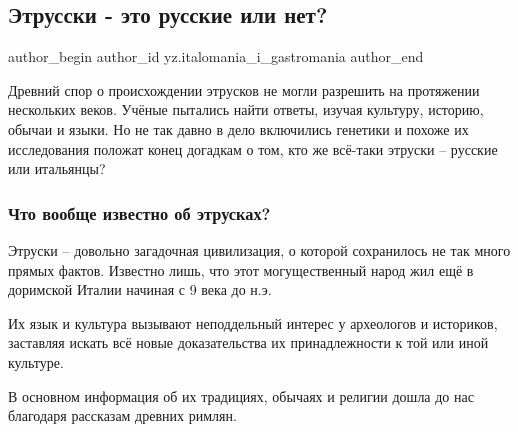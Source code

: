  
 
 
 
 
 
\subsection{Этрусски - это русские или нет?}
\label{sec:19_01_2022.yz.italomania_i_gastromania.1.etruski_russkie}
 
\ifcmt
 author_begin
   author_id yz.italomania_i_gastromania
 author_end
\fi

Древний спор о происхождении этрусков не могли разрешить на протяжении
нескольких веков. Учёные пытались найти ответы, изучая культуру, историю,
обычаи и языки. Но не так давно в дело включились генетики и похоже их
исследования положат конец догадкам о том, кто же всё-таки этруски – русские
или итальянцы?


\subsubsection{Что вообще известно об этрусках?}

Этруски – довольно загадочная цивилизация, о которой сохранилось не так много
прямых фактов. Известно лишь, что этот могущественный народ жил ещё в доримской
Италии начиная с 9 века до н.э.

Их язык и культура вызывают неподдельный интерес у археологов и историков,
заставляя искать всё новые доказательства их принадлежности к той или иной
культуре.


\begin{zznagolos}
В основном информация об их традициях, обычаях и религии дошла до нас благодаря
рассказам древних римлян. 	
\end{zznagolos}

